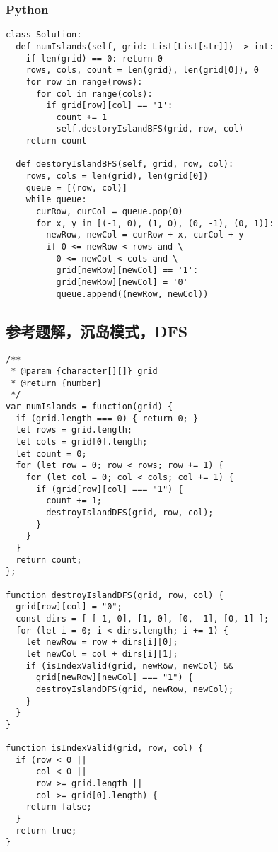 \subsubsection{Python}

\begin{verbatim}
class Solution:
  def numIslands(self, grid: List[List[str]]) -> int:
    if len(grid) == 0: return 0
    rows, cols, count = len(grid), len(grid[0]), 0
    for row in range(rows):
      for col in range(cols):
        if grid[row][col] == '1':
          count += 1
          self.destoryIslandBFS(grid, row, col)
    return count

  def destoryIslandBFS(self, grid, row, col):
    rows, cols = len(grid), len(grid[0])
    queue = [(row, col)]
    while queue:
      curRow, curCol = queue.pop(0)
      for x, y in [(-1, 0), (1, 0), (0, -1), (0, 1)]:
        newRow, newCol = curRow + x, curCol + y
        if 0 <= newRow < rows and \
          0 <= newCol < cols and \
          grid[newRow][newCol] == '1':
          grid[newRow][newCol] = '0'
          queue.append((newRow, newCol))
\end{verbatim}

\subsection{参考题解，沉岛模式，DFS}

\begin{verbatim}
/**
 * @param {character[][]} grid
 * @return {number}
 */
var numIslands = function(grid) {
  if (grid.length === 0) { return 0; }
  let rows = grid.length;
  let cols = grid[0].length;
  let count = 0;
  for (let row = 0; row < rows; row += 1) {
    for (let col = 0; col < cols; col += 1) {
      if (grid[row][col] === "1") {
        count += 1;
        destroyIslandDFS(grid, row, col);
      }
    }
  }
  return count;
};

function destroyIslandDFS(grid, row, col) {
  grid[row][col] = "0";
  const dirs = [ [-1, 0], [1, 0], [0, -1], [0, 1] ];
  for (let i = 0; i < dirs.length; i += 1) {
    let newRow = row + dirs[i][0];
    let newCol = col + dirs[i][1];
    if (isIndexValid(grid, newRow, newCol) &&
      grid[newRow][newCol] === "1") {
      destroyIslandDFS(grid, newRow, newCol);
    }
  }
}

function isIndexValid(grid, row, col) {
  if (row < 0 ||
      col < 0 ||
      row >= grid.length ||
      col >= grid[0].length) {
    return false;
  }
  return true;
}
\end{verbatim}

